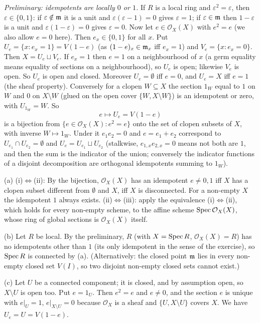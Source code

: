 \documentclass[11pt]{article}
\begin{document}
\emph{Preliminary: idempotents are locally $0$ or $1$.} If $R$ is a local ring and $\varepsilon^2=\varepsilon$, then $\varepsilon\in\{0,1\}$: if $\varepsilon\notin\mathfrak m$ it is a unit and $\varepsilon(\varepsilon-1)=0$ gives $\varepsilon=1$; if $\varepsilon\in\mathfrak m$ then $1-\varepsilon$ is a unit and $\varepsilon(1-\varepsilon)=0$ gives $\varepsilon=0$. Now let $e\in\mathcal O_X(X)$ with $e^2=e$ (we also allow $e=0$ here). Then $e_x\in\{0,1\}$ for all $x$. Put $U_e=\{x:e_x=1\}=V(1-e)$ (as $(1-e)_x\in\mathfrak m_x$ iff $e_x=1$) and $V_e=\{x:e_x=0\}$. Then $X=U_e\sqcup V_e$. If $e_x=1$ then $e=1$ on a neighbourhood of $x$ (a germ equality means equality of sections on a neighbourhood), so $U_e$ is open; likewise $V_e$ is open. So $U_e$ is open and closed. Moreover $U_e=\emptyset$ iff $e=0$, and $U_e=X$ iff $e=1$ (the sheaf property). Conversely for a clopen $W\subseteq X$ the section $1_W$ equal to $1$ on $W$ and $0$ on $X\setminus W$ (glued on the open cover $\{W,X\setminus W\}$) is an idempotent or zero, with $U_{1_W}=W$. So
\[ e\longmapsto U_e=V(1-e)\]
is a bijection from $\{e\in\mathcal O_X(X): e^2=e\}$ onto the set of clopen subsets of $X$, with inverse $W\mapsto 1_W$. Under it $e_1e_2=0$ and $e=e_1+e_2$ correspond to $U_{e_1}\cap U_{e_2}=\emptyset$ and $U_e=U_{e_1}\sqcup U_{e_2}$ (stalkwise, $e_{1,x}e_{2,x}=0$ means not both are $1$, and then the sum is the indicator of the union; conversely the indicator functions of a disjoint decomposition are orthogonal idempotents summing to $1_W$).

(a) (i)$\Leftrightarrow$(ii): By the bijection, $\mathcal O_X(X)$ has an idempotent $e\ne0,1$ iff $X$ has a clopen subset different from $\emptyset$ and $X$, iff $X$ is disconnected. For a non-empty $X$ the idempotent $1$ always exists. (ii)$\Leftrightarrow$(iii): apply the equivalence (i)$\Leftrightarrow$(ii), which holds for every non-empty scheme, to the affine scheme $\operatorname{Spec}\mathcal O_X(X)$, whose ring of global sections is $\mathcal O_X(X)$ itself.

(b) Let $R$ be local. By the preliminary, $R$ (with $X=\operatorname{Spec} R$, $\mathcal O_X(X)=R$) has no idempotents other than $1$ (its only idempotent in the sense of the exercise), so $\operatorname{Spec} R$ is connected by (a). (Alternatively: the closed point $\mathfrak m$ lies in every non-empty closed set $V(I)$, so two disjoint non-empty closed sets cannot exist.)

(c) Let $U$ be a connected component; it is closed, and by assumption open, so $X\setminus U$ is open too. Put $e=1_U$. Then $e^2=e$ and $e\ne0$, and the section $e$ is unique with $e|_U=1$, $e|_{X\setminus U}=0$ because $\mathcal O_X$ is a sheaf and $\{U,X\setminus U\}$ covers $X$. We have $U_e=U=V(1-e)$.
\end{document}
